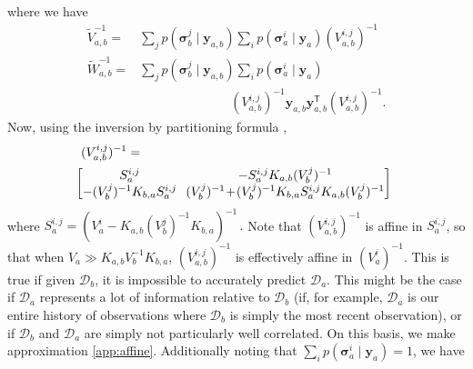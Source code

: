 \documentclass[twoside]{article}
\newcommand{\deq}{=}
\newcommand{\given}{\!\ensuremath{\mid}\!}
\newcommand{\cm}[1]{\ensuremath{\mathcal{#1}}}
\newcommand{\bm}[1]{\ensuremath{\mathbf{#1}}}
\newcommand{\data}{\ensuremath{\cm{D}}}
\newcommand{\vect}[1]{\bm{#1}}
\newcommand{\vy}{\vect{y}}
\newcommand{\vs}{\vect{\sigma}}
\newcommand{\amean}[2]{\tilde{{m}}(#1 \given #2 )}
\newcommand{\acov}[2]{\tilde{{C}}(#1 \given #2 )}
\newcommand{\fPr}{p}
\newcommand{\Prob}[2]{\fPr(#1 \given #2 )}
\newcommand{\st}{_{\star}}
\newcommand{\tr}{\ensuremath{\mathsf{T}}}
\begin{document}
where we have
\begin{align*}
\tilde{V}^{-1}_{a,b} \deq {} &
\sum_{j} \Prob{\vs^j_{b}}{\vy_{a,b}}\sum_i \Prob{\vs^i_{a}}{\vy_{a}} (V_{a,b}^{i,j})^{-1} \\
\tilde{W}^{-1}_{a,b} \deq {} &
\sum_{j} \Prob{\vs^j_{b}}{\vy_{a,b}}\sum_i \Prob{\vs^i_{a}}{\vy_{a}} 
\\
& \hspace{3cm}
(V_{a,b}^{i,j})^{-1}  
 \vy_{a,b}^{\phantom{\tr}} \vy_{a,b}^\tr (V_{a,b}^{i,j})^{-1}.
\end{align*}
Now, using the inversion by partitioning formula \citep[Section 2.7]
{NumericalRecipes},
\begin{align*}
&
({V}^{i,j}_{a,b})^{-1} =
\\
& \hspace{-0.2cm}
\begin{bmatrix}
 S^{i,j}_a &\hspace{-0.1cm} -S^{i,j}_a K_{a,b} (V^j_b)^{-1} \\
 - (V^j_b)^{-1} K_{b,a} S^{i,j}_a &\hspace{-0.1cm} (V^j_b)^{-1}\!+\!(V^j_b)^{-1} K_{b,a} S^{i,j}_a K_{a,b} (V^j_b)^{-1} 
\end{bmatrix}
\end{align*}
where
$
S^{i,j}_a \deq (V^i_a -K_{a,b} (V^j_b)^{-1}K_{b,a})^{-1}\,.
$ Note that $({V}^{i,j}_{a,b})^{-1}$ is affine in $S^{i,j}_a$, so that when $V_a \gg K_{a,b} V_b^{-1} K_{b,a}$,
$({V}^{i,j}_{a,b})^{-1}$ is effectively affine in $(V^i_a)^{-1}$. This
is true if given $\data_b$, it is impossible to accurately predict
$\data_a$. This might be the case if $\data_a$ represents a lot of
information relative to $\data_b$ (if, for example, $\data_a$ is our
entire history of observations where $\data_b$ is simply the most
recent observation), or if $\data_b$ and $\data_a$ are simply not
particularly well correlated. On this basis, we make approximation \ref{app:affine}. Additionally noting that $\sum_i \Prob{\vs^i_{a}}{\vy_{a}} = 1$, we have
\end{document}
